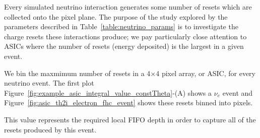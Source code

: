 Every simulated neutrino interaction generates some number of resets which are collected onto the pixel plane.
The purpose of the study explored by the parameters described in Table~\ref{table:neutrino_params} is to investigate the charge resets these interactions produce; we pay particularly close attention to ASICs where the number of resets (energy deposited) is the largest in a given event.

We bin the maxmimum number of resets in a 4$\times$4 pixel array, or ASIC, for every neutrino event.
The first plot Figure~\ref{fig:example_asic_integral_value_constTheta}-(A) shows a $\nu_{e}$ event and Figure~\ref{fig:asic_th2i_electron_fhc_event} shows these resets binned into pixels.

This value represents the required local FIFO depth in order to capture all of the resets produced by this event.
 
